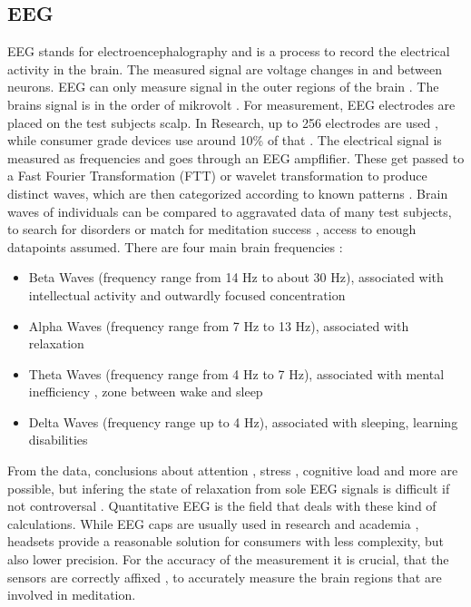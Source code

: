 \documentclass{llncs} %
\begin{document}
\subsection{EEG}
EEG stands for electroencephalography and is a process to record the electrical activity in the brain. The measured signal are voltage changes in and between neurons. EEG can only measure signal in the outer regions of the brain \cite{Sitaram}.
The brains signal is in the order of mikrovolt \cite{Berger}. For measurement, EEG electrodes are placed on the test subjects scalp. In Research, up to 256 electrodes are used \cite{Seeck}, while consumer grade devices use around 10\% of that \cite{Maskeliunas}.
The electrical signal is measured as frequencies and goes through an EEG ampflifier. These get passed to a Fast Fourier Transformation (FTT) or wavelet transformation \cite{Akin} to produce distinct waves, which are then categorized according to known patterns \cite{Shaker}.
Brain waves of individuals can be compared to aggravated data of many test subjects, to search for disorders \cite{Loo} or match for meditation success \cite{Tang:et al}, access to enough datapoints assumed.
There are four main brain frequencies \cite{Cahn}:
\begin{itemize}
    \item 
    Beta Waves (frequency range from 14 Hz to about 30 Hz), associated with intellectual activity and outwardly focused concentration
    \item 
    Alpha Waves (frequency range from 7 Hz to 13 Hz), associated with relaxation
    \item 
    Theta Waves (frequency range from 4 Hz to 7 Hz), associated with mental inefficiency \cite{Hammond}, zone between wake and sleep
    \item 
    Delta Waves (frequency range up to 4 Hz), associated with sleeping, learning disabilities \cite{Hammond}
\end{itemize}
From the data, conclusions about attention \cite{Berka}, stress \cite{Hosseini}, cognitive load \cite{Antonenko} and more are possible, but infering the state of relaxation from sole EEG signals is difficult if not controversal \cite{Maskeliunas}. Quantitative EEG is the field that deals with these kind of calculations.
While EEG caps are usually used in research and academia \cite{Seeck}, headsets provide a reasonable solution for consumers with less complexity, but also lower precision\cite{Maskeliunas}.
For the accuracy of the measurement it is crucial, that the sensors are correctly affixed \cite{Seeck}, to accurately measure the brain regions that are involved in meditation.
\medskip
\end{document}
